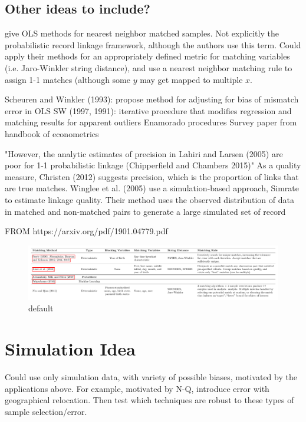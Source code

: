 \documentclass[12pt]{article}
\begin{document}
\subsection{Other ideas to include?}
\cite{hirukawa2018} give OLS methods for nearest neighbor matched samples.  Not explicitly the probabilistic record linkage framework, although the authors use this term. Could apply their methods for an appropriately defined metric for matching variables (i.e. Jaro-Winkler string distance), and use a nearest neighbor matching rule to assign 1-1 matches (although some $y$ may get mapped to multiple $x$. 



 Scheuren and Winkler (1993): propose method for adjusting for bias of mismatch error in OLS
 SW (1997, 1991): iterative procedure that modifies regression and matching results for apparent outliers 
 Enamorado procedures
 Survey paper from handbook of econometrics
 
 "However, the analytic estimates of precision in Lahiri
and Larsen (2005) are poor for 1-1 probabilistic linkage (Chipperfield and Chambers
2015)"   As a quality measure, Christen (2012) suggests precision, which is the proportion of
links that are true matches. Winglee et al. (2005) use a simulation-based approach,
Simrate to estimate linkage quality. Their method uses the observed distribution of
data in matched and non-matched pairs to generate a large simulated set of record 

FROM https://arxiv.org/pdf/1901.04779.pdf
 


\begin{figure}[htbp]
\begin{center}
\includegraphics[width=\textwidth]{methods_table.pdf}
\caption{default}
\label{default}
\end{center}
\end{figure}

\section*{Simulation Idea}
Could use only simulation data, with variety of possible biases, motivated by the applications above.  For example, motivated by  N-Q, introduce error with geographical relocation.  Then test which techniques are robust to these types of sample selection/error.   
\end{document}

